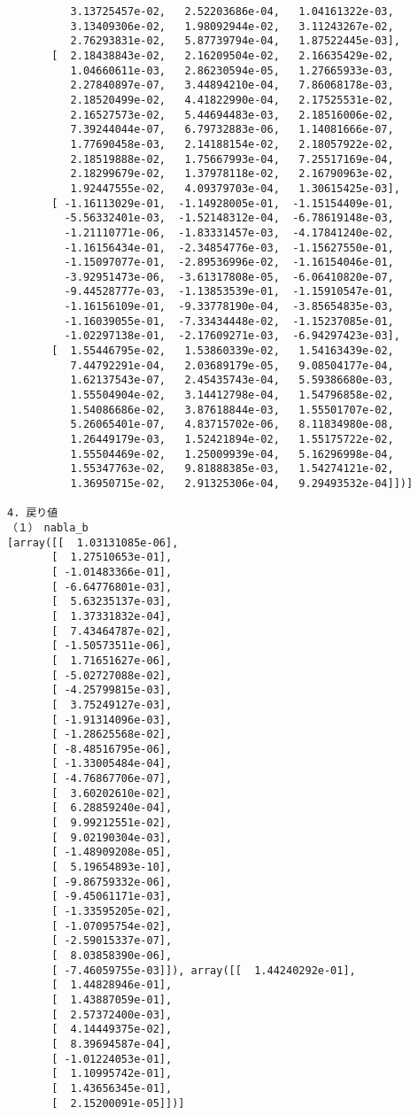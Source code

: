 \documentclass[11pt,a4j,fleqn]{jarticle}
\begin{document}
\begin{verbatim}
          3.13725457e-02,   2.52203686e-04,   1.04161322e-03,
          3.13409306e-02,   1.98092944e-02,   3.11243267e-02,
          2.76293831e-02,   5.87739794e-04,   1.87522445e-03],
       [  2.18438843e-02,   2.16209504e-02,   2.16635429e-02,
          1.04660611e-03,   2.86230594e-05,   1.27665933e-03,
          2.27840897e-07,   3.44894210e-04,   7.86068178e-03,
          2.18520499e-02,   4.41822990e-04,   2.17525531e-02,
          2.16527573e-02,   5.44694483e-03,   2.18516006e-02,
          7.39244044e-07,   6.79732883e-06,   1.14081666e-07,
          1.77690458e-03,   2.14188154e-02,   2.18057922e-02,
          2.18519888e-02,   1.75667993e-04,   7.25517169e-04,
          2.18299679e-02,   1.37978118e-02,   2.16790963e-02,
          1.92447555e-02,   4.09379703e-04,   1.30615425e-03],
       [ -1.16113029e-01,  -1.14928005e-01,  -1.15154409e-01,
         -5.56332401e-03,  -1.52148312e-04,  -6.78619148e-03,
         -1.21110771e-06,  -1.83331457e-03,  -4.17841240e-02,
         -1.16156434e-01,  -2.34854776e-03,  -1.15627550e-01,
         -1.15097077e-01,  -2.89536996e-02,  -1.16154046e-01,
         -3.92951473e-06,  -3.61317808e-05,  -6.06410820e-07,
         -9.44528777e-03,  -1.13853539e-01,  -1.15910547e-01,
         -1.16156109e-01,  -9.33778190e-04,  -3.85654835e-03,
         -1.16039055e-01,  -7.33434448e-02,  -1.15237085e-01,
         -1.02297138e-01,  -2.17609271e-03,  -6.94297423e-03],
       [  1.55446795e-02,   1.53860339e-02,   1.54163439e-02,
          7.44792291e-04,   2.03689179e-05,   9.08504177e-04,
          1.62137543e-07,   2.45435743e-04,   5.59386680e-03,
          1.55504904e-02,   3.14412798e-04,   1.54796858e-02,
          1.54086686e-02,   3.87618844e-03,   1.55501707e-02,
          5.26065401e-07,   4.83715702e-06,   8.11834980e-08,
          1.26449179e-03,   1.52421894e-02,   1.55175722e-02,
          1.55504469e-02,   1.25009939e-04,   5.16296998e-04,
          1.55347763e-02,   9.81888385e-03,   1.54274121e-02,
          1.36950715e-02,   2.91325306e-04,   9.29493532e-04]])]

4. 戻り値
（１）　nabla_b
[array([[  1.03131085e-06],
       [  1.27510653e-01],
       [ -1.01483366e-01],
       [ -6.64776801e-03],
       [  5.63235137e-03],
       [  1.37331832e-04],
       [  7.43464787e-02],
       [ -1.50573511e-06],
       [  1.71651627e-06],
       [ -5.02727088e-02],
       [ -4.25799815e-03],
       [  3.75249127e-03],
       [ -1.91314096e-03],
       [ -1.28625568e-02],
       [ -8.48516795e-06],
       [ -1.33005484e-04],
       [ -4.76867706e-07],
       [  3.60202610e-02],
       [  6.28859240e-04],
       [  9.99212551e-02],
       [  9.02190304e-03],
       [ -1.48909208e-05],
       [  5.19654893e-10],
       [ -9.86759332e-06],
       [ -9.45061171e-03],
       [ -1.33595205e-02],
       [ -1.07095754e-02],
       [ -2.59015337e-07],
       [  8.03858390e-06],
       [ -7.46059755e-03]]), array([[  1.44240292e-01],
       [  1.44828946e-01],
       [  1.43887059e-01],
       [  2.57372400e-03],
       [  4.14449375e-02],
       [  8.39694587e-04],
       [ -1.01224053e-01],
       [  1.10995742e-01],
       [  1.43656345e-01],
       [  2.15200091e-05]])]


\end{verbatim}
\end{document}
